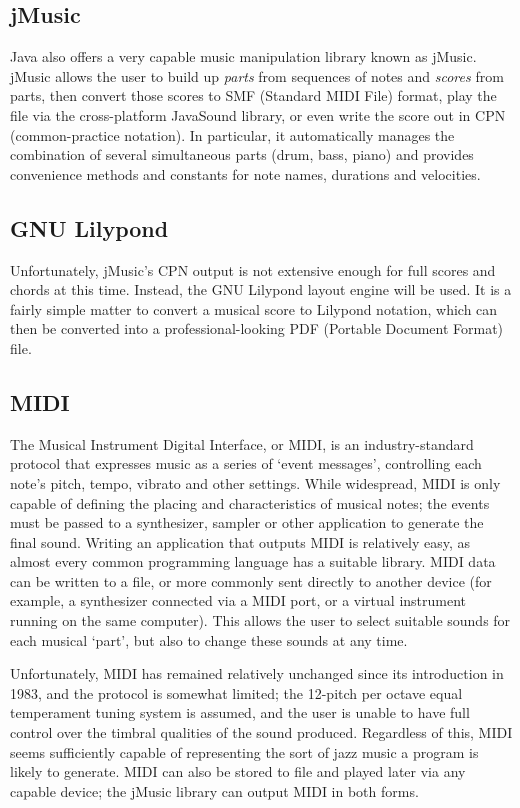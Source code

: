 \subsection{jMusic}

Java also offers a very capable music manipulation library known as jMusic. jMusic allows the user to build up \emph{parts} from sequences of notes and \emph{scores} from parts, then convert those scores to SMF (Standard MIDI File) format, play the file via the cross-platform JavaSound library, or even write the score out in CPN (common-practice notation). In particular, it automatically manages the combination of several simultaneous parts (drum, bass, piano) and provides convenience methods and constants for note names, durations and velocities.

\subsection{GNU Lilypond}

Unfortunately, jMusic's CPN output is not extensive enough for full scores and chords at this time. Instead, the GNU Lilypond layout engine will be used. It is a fairly simple matter to convert a musical score to Lilypond notation, which can then be converted into a professional-looking PDF (Portable Document Format) file.

\subsection{MIDI}

The Musical Instrument Digital Interface, or MIDI, is an industry-standard protocol that expresses music as a series of `event messages', controlling each note's pitch, tempo, vibrato and other settings. While widespread, MIDI is only capable of defining the placing and characteristics of musical notes; the events must be passed to a synthesizer, sampler or other application to generate the final sound. Writing an application that outputs MIDI is relatively easy, as almost every common programming language has a suitable library. MIDI data can be written to a file, or more commonly sent directly to another device (for example, a synthesizer connected via a MIDI port, or a virtual instrument running on the same computer). This allows the user to select suitable sounds for each musical `part', but also to change these sounds at any time.

Unfortunately, MIDI has remained relatively unchanged since its introduction in 1983, and the protocol is somewhat limited; the 12-pitch per octave equal temperament tuning system is assumed, and the user is unable to have full control over the timbral qualities of the sound produced. Regardless of this, MIDI seems sufficiently capable of representing the sort of jazz music a program is likely to generate. MIDI can also be stored to file and played later via any capable device; the jMusic library can output MIDI in both forms.

